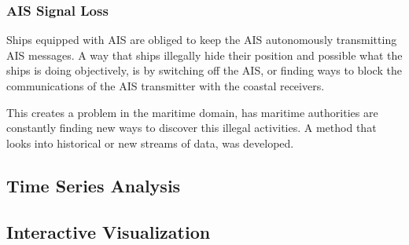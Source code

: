 \subsubsection{AIS Signal Loss}
Ships equipped with AIS are obliged to keep the AIS autonomously transmitting AIS messages. A way that ships illegally hide their position and possible what the ships is doing objectively, is by switching off the AIS, or finding ways to block the communications of the AIS transmitter with the coastal receivers.

This creates a problem in the maritime domain, has maritime authorities are constantly finding new ways to discover this illegal activities. A method that looks into historical or new streams of data, was developed. 


\subsection{Time Series Analysis}

\subsection{Interactive Visualization}




